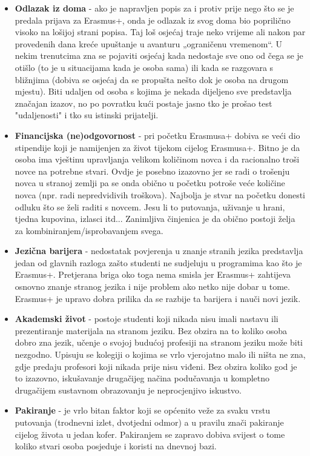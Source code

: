 \documentclass[]{foi}
\begin{document}
\begin{itemize}
    \item \textbf{Odlazak iz doma} - ako je napravljen popis za i protiv prije nego što se je predala prijava za Erasmus+, onda je odlazak iz svog doma bio poprilično visoko na lošijoj strani 
    popisa. Taj loš osjećaj traje neko vrijeme ali nakon par provedenih dana kreće upuštanje u avanturu „ograničenu vremenom“. U nekim trenutcima zna se pojaviti osjećaj kada nedostaje sve ono od čega 
    se je otišlo (to je u situacijama kada je osoba sama) ili kada se razgovara s bližnjima (dobiva se osjećaj da se propušta nešto dok je osoba na drugom mjestu). 
    Biti udaljen od osoba s kojima je nekada dijeljeno sve predstavlja značajan izazov, no po povratku kući postaje jasno tko je prošao test "udaljenosti" i tko su istinski prijatelji.
    \item \textbf{Financijska (ne)odgovornost} - pri početku Erasmusa+ dobiva se veći dio stipendije koji je namijenjen za život tijekom cijelog Erasmusa+. Bitno je da osoba ima vještinu 
    upravljanja velikom količinom novca i da racionalno troši novce na potrebne stvari. Ovdje je posebno izazovno jer se radi o trošenju novca u stranoj zemlji pa se onda obično u početku 
    potroše veće količine novca (npr. radi nepredvidivih troškova). Najbolja je stvar na početku donesti odluku što se želi raditi s novcem. Jesu li to putovanja, uživanje u hrani,
    tjedna kupovina, izlasci itd... Zanimljiva činjenica je da obično postoji želja za kombiniranjem/isprobavanjem svega.
    \item \textbf{Jezična barijera} - nedostatak povjerenja u znanje stranih jezika predstavlja jedan od glavnih razloga zašto studenti ne sudjeluju u programima kao što je Erasmus+. 
    Pretjerana briga oko toga nema smisla jer Erasmus+ zahtijeva osnovno znanje stranog jezika i nije problem ako netko nije dobar u tome. Erasmus+ je upravo dobra prilika da se razbije 
    ta barijera i nauči novi jezik.
    \item \textbf{Akademski život} - postoje studenti koji nikada nisu imali nastavu ili prezentiranje materijala na stranom jeziku. Bez obzira na to koliko osoba dobro zna jezik, 
    učenje o svojoj budućoj profesiji na stranom jeziku može biti nezgodno. Upisuju se kolegiji o kojima se vrlo vjerojatno malo ili ništa ne zna, gdje predaju profesori koji nikada prije 
    nisu viđeni. Bez obzira koliko god je to izazovno, iskušavanje drugačijeg načina podučavanja u kompletno drugačijem sustavnom obrazovanju je neprocjenjivo iskustvo.
    \item \textbf{Pakiranje} - je vrlo bitan faktor koji se općenito veže za svaku vrstu putovanja (trodnevni izlet, dvotjedni odmor) a u pravilu znači pakiranje cijelog života u jedan kofer. 
    Pakiranjem se zapravo dobiva svijest o tome koliko stvari osoba posjeduje i koristi na dnevnoj bazi. 
    
\end{itemize}
\end{document}
